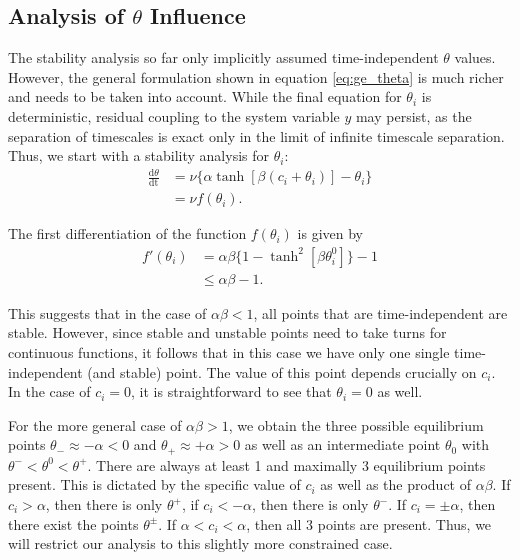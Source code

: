 \documentclass[reprint,amsmath,amssymb,aps]{revtex4-2}
\begin{document}
\subsection{Analysis of $\theta$ Influence}
The stability analysis so far only implicitly assumed time-independent $\theta$ values. However, the general formulation shown in equation \eqref{eq:ge_theta} is much richer and needs to be taken into account. While the final equation for $\theta_i$ is deterministic, residual coupling to the system variable $y$ may persist, as the separation of timescales is exact only in the limit of infinite timescale separation. Thus, we start with a stability analysis for $\theta_i$:
\begin{align*}
    \frac{\mathrm{d}\theta}{\mathrm{dt}} 
    &=
    \nu \Big\{
    \alpha \tanh\left[\beta(c_i + \theta_i)\right]
    -\theta_i
    \Big\}\\
    &=
    \nu f(\theta_i).
\end{align*}

The first differentiation of the function $f(\theta_i)$ is given by
\begin{align}
    f'(\theta_i)
    &=
    \alpha\beta \Big\{1-\tanh^2\left[\beta \theta_i^0\right] \Big\} - 1 
    \nonumber
    \\
    &\leq \alpha\beta -1.
    \label{eq:theta_stability}
\end{align}

This suggests that in the case of $\alpha\beta<1$, all points that are time-independent are stable. However, since stable and unstable points need to take turns for continuous functions, it follows that in this case we have only one single time-independent (and stable) point. The value of this point depends crucially on $c_i$. In the case of $c_i=0$, it is straightforward to see that $\theta_i=0$ as well.

For the more general case of $\alpha\beta>1$, we obtain the three possible equilibrium points $\theta_-\approx - \alpha<0$ and $\theta_+\approx +\alpha>0$ as well as an intermediate point $\theta_0$ with $\theta^-< \theta^0 < \theta^+$. There are always at least 1 and maximally 3 equilibrium points present. This is dictated by the specific value of $c_i$ as well as the product of $\alpha\beta$. If $c_i>\alpha$, then there is only $\theta^+$, if $c_i<-\alpha$, then there is only $\theta^-$. If $c_i=\pm\alpha$, then there exist the points $\theta^\pm$. If $\alpha<c_i<\alpha$, then all 3 points are present. Thus, we will restrict our analysis to this slightly more constrained case.
\end{document}
